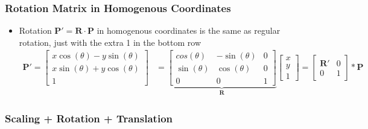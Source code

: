\documentclass[letterpaper,12pt]{article}
\newcommand{\vect}[1]{\mathbf{#1}}
\newcommand{\matr}[1]{\mathbf{#1}}
\begin{document}
\subsubsection{Rotation Matrix in Homogenous Coordinates}
\begin{itemize}
 \item Rotation $\vect{P}' = \matr{R} \cdot \vect{P}$ in homogenous coordinates is the same as regular rotation, just with the extra 1 in the bottom row
       \begin{align}
        \vect{P}' = \begin{bmatrix}
         x\cos(\theta) - y\sin(\theta) \\
         x\sin(\theta) + y\cos(\theta) \\
         1
        \end{bmatrix}
         & = \underbrace{\begin{bmatrix}
          cos(\theta)  & -\sin(\theta) & 0 \\
          \sin(\theta) & \cos(\theta)  & 0 \\
          0            & 0             & 1
         \end{bmatrix}}_\matr{R}
        \begin{bmatrix}
         x \\
         y \\
         1
        \end{bmatrix}
        = \begin{bmatrix}
         \matr{R}' & 0 \\
         0         & 1
        \end{bmatrix}
        * \vect{P}
       \end{align}
\end{itemize}

\subsubsection{Scaling + Rotation + Translation}
\end{document}
